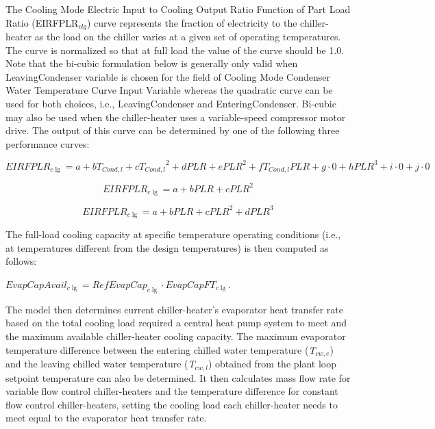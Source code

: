 The Cooling Mode Electric Input to Cooling Output Ratio Function of Part Load Ratio (EIRFPLR\(_{clg}\)) curve represents the fraction of electricity to the chiller-heater as the load on the chiller varies at a given set of operating temperatures. The curve is normalized so that at full load the value of the curve should be 1.0. Note that the bi-cubic formulation below is generally only valid when LeavingCondenser variable is chosen for the field of Cooling Mode Condenser Water Temperature Curve Input Variable whereas the quadratic curve can be used for both choices, i.e., LeavingCondenser and EnteringCondenser. Bi-cubic may also be used when the chiller-heater uses a variable-speed compressor motor drive. The output of this curve can be determined by one of the following three performance curves:

\begin{equation}
EIRFPL{R_{c\lg }} = a + b{T_{Cond,l}} + c{T_{Cond,l}}^2 + dPLR + ePL{R^2} + f{T_{Cond,l}}PLR + g \cdot 0 + hPL{R^3} + i \cdot 0 + j \cdot 0
\end{equation}

\begin{equation}
EIRFPL{R_{c\lg }} = a + bPLR + cPL{R^2}
\end{equation}

\begin{equation}
EIRFPL{R_{c\lg }} = a + bPLR + cPL{R^2} + dPL{R^3}
\end{equation}

The full-load cooling capacity at specific temperature operating conditions (i.e., at temperatures different from the design temperatures) is then computed as follows:

\textbf{\emph{\(EvapCapAvai{l_{c\lg }} = RefEvapCa{p_{c\lg }} \cdot EvapCapF{T_{c\lg }}\)}}.

The model then determines current chiller-heater's evaporator heat transfer rate based on the total cooling load required a central heat pump system to meet and the maximum available chiller-heater cooling capacity. The maximum evaporator temperature difference between the entering chilled water temperature (\emph{T\(_{cw,e}\)}) and the leaving chilled water temperature (\emph{T\(_{cw,l}\)}) obtained from the plant loop setpoint temperature can also be determined. It then calculates mass flow rate for variable flow control chiller-heaters and the temperature difference for constant flow control chiller-heaters, setting the cooling load each chiller-heater needs to meet equal to the evaporator heat transfer rate.

